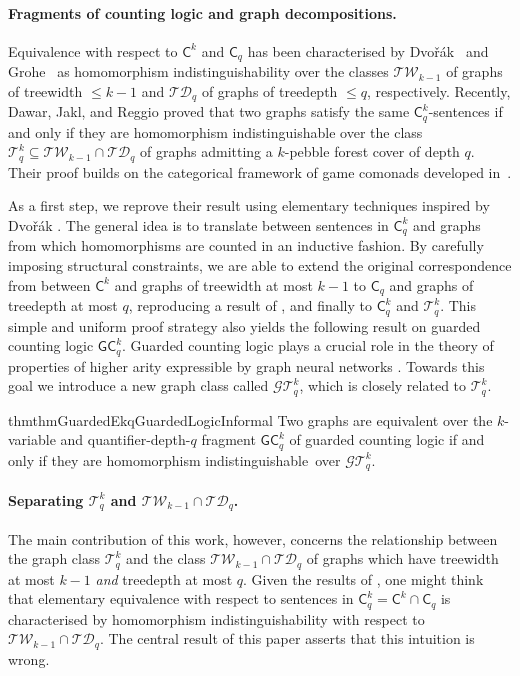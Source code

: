 \documentclass{lmcs}
\theoremstyle{plain}\newtheorem{claim}[thm]{Claim}   %
\newcommand{\cG}{\ensuremath{\mathcal G}}
\newcommand{\cT}{\ensuremath{\mathcal T}}
\newcommand	{\homIndable}		{homomorphism indistinguishable}
\newcommand{\Ekq}{\ensuremath{\cT_{q}^{k}}}
\newcommand{\GEkqLL}{\ensuremath{\cG\Ekq}}
\begin{document}
\paragraph{Fragments of counting logic and graph decompositions.}
Equivalence with respect to $\mathsf{C}^{k}$ and $\mathsf{C}_q$ has been characterised by Dvo\v{r}ák~\cite{Dvorak_recognizing_2010} and Grohe~\cite{Grohe_counting_2020} as homomorphism indistinguishability over the classes $\mathcal{TW}_{k-1}$ of graphs of treewidth $\leq k-1$ and $\mathcal{TD}_q$ of graphs of treedepth $\leq q$, respectively.
Recently, Dawar, Jakl, and Reggio \cite{dawar_lovasz-type_2021} proved that two graphs satisfy the same $\mathsf{C}^k_q$-sentences if and only if they are homomorphism indistinguishable over the class $\Ekq \subseteq \mathcal{TW}_{k-1} \cap \mathcal{TD}_q$ of graphs admitting a $k$-pebble forest cover of depth $q$. Their proof builds on the categorical framework of game comonads developed in~\cite{Abramsky_pebbling_2017}.

As a first step, we reprove their result using elementary techniques inspired by Dvo\v{r}\'ak \cite{Dvorak_recognizing_2010}. The general idea is to translate between sentences in $\mathsf{C}^k_q$ and graphs from which homomorphisms are counted in an inductive fashion. By carefully imposing structural constraints, we are able to extend the original correspondence from \cite{Dvorak_recognizing_2010} between $\mathsf{C}^{k}$ and graphs of treewidth at most $k-1$ to $\mathsf{C}_q$ and graphs of treedepth at most $q$, reproducing a result of \cite{Grohe_counting_2020}, and finally to $\mathsf{C}^k_q$ and $\Ekq$. This simple and uniform proof strategy also yields the following result on guarded counting logic $\mathsf{GC}^k_q$.
Guarded counting logic plays a crucial role in the theory of properties of higher arity expressible by graph neural networks \cite{grohe_logic_2021}.
Towards this goal we introduce a new graph class called \GEkqLL, which is closely related to \Ekq.

\begin{restatable}{thm}{thmGuardedEkqGuardedLogicInformal}
	\label{thm:guardedEkq_vs_guarded-logic-informal}
	Two graphs are equivalent over the $k$-variable and quantifier-depth-$q$ fragment $\mathsf{GC}^k_q$ of guarded counting logic if and only if they are \homIndable\ over \GEkqLL.
\end{restatable}

\paragraph{Separating $\Ekq$ and $\mathcal{TW}_{k-1} \cap \mathcal{TD}_q$.}
The main contribution of this work, however, concerns the relationship between the graph class $\Ekq$ and the class $\mathcal{TW}_{k-1} \cap \mathcal{TD}_q$ of graphs which have treewidth at most $k-1$ \emph{and} treedepth at most $q$.
Given the results of \cite{Dvorak_recognizing_2010,Grohe_counting_2020}, one might think that elementary equivalence with respect to sentences in $\mathsf{C}^{k}_q = \mathsf{C}^{k} \cap \mathsf{C}_q$ is characterised by homomorphism indistinguishability with respect to $\mathcal{TW}_{k-1} \cap \mathcal{TD}_q$. The central result of this paper asserts that this intuition is wrong.
\end{document}

